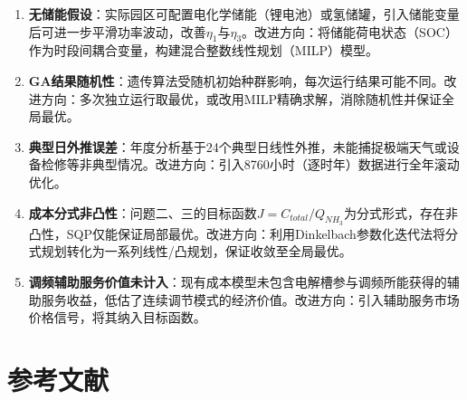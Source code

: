 \documentclass[UTF8,12pt,a4paper]{ctexart}
\begin{document}
\begin{enumerate}[leftmargin=3em, itemsep=0.3em]
  \item \textbf{无储能假设}：实际园区可配置电化学储能（锂电池）或氢储罐，引入储能变量后可进一步平滑功率波动，改善$\eta_1$与$\eta_3$。改进方向：将储能荷电状态（SOC）作为时段间耦合变量，构建混合整数线性规划（MILP）模型。

  \item \textbf{GA结果随机性}：遗传算法受随机初始种群影响，每次运行结果可能不同。改进方向：多次独立运行取最优，或改用MILP精确求解，消除随机性并保证全局最优。

  \item \textbf{典型日外推误差}：年度分析基于24个典型日线性外推，未能捕捉极端天气或设备检修等非典型情况。改进方向：引入8760小时（逐时年）数据进行全年滚动优化。

  \item \textbf{成本分式非凸性}：问题二、三的目标函数$J=C_{total}/Q_{NH_3}$为分式形式，存在非凸性，SQP仅能保证局部最优。改进方向：利用Dinkelbach参数化迭代法将分式规划转化为一系列线性/凸规划，保证收敛至全局最优。

  \item \textbf{调频辅助服务价值未计入}：现有成本模型未包含电解槽参与调频所能获得的辅助服务收益，低估了连续调节模式的经济价值。改进方向：引入辅助服务市场价格信号，将其纳入目标函数。
\end{enumerate}

\section*{参考文献}
\end{document}
